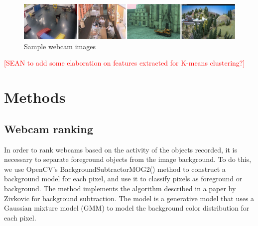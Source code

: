 \documentclass[10pt]{article} %
\begin{document}
\begin{figure}[h]
\caption{Sample webcam images}
\includegraphics[scale = 0.25]{samples}
\end{figure}

\textcolor{red}{[SEAN to add some elaboration on features extracted for K-means clustering?]}

\section{Methods}
\subsection{Webcam ranking}
In order to rank webcams based on the activity of the objects recorded, it is necessary to separate foreground objects from the image background. To do this, we use OpenCV's BackgroundSubtractorMOG2() method to construct a background model for each pixel, and use it to classify pixels as foreground or background. The method implements the algorithm described in a paper by Zivkovic \cite{zivkovic} for background subtraction. The model is a generative model that uses a Gaussian mixture model (GMM) to model the background color distribution for each pixel. 
\end{document}
